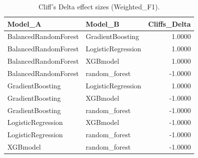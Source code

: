 \begin{table}[t]
\centering
\begin{tabular}{llr}
\toprule
Model_A & Model_B & Cliffs_Delta \\
\midrule
BalancedRandomForest & GradientBoosting & 1.0000 \\
BalancedRandomForest & LogisticRegression & 1.0000 \\
BalancedRandomForest & XGBmodel & 1.0000 \\
BalancedRandomForest & random_forest & -1.0000 \\
GradientBoosting & LogisticRegression & 1.0000 \\
GradientBoosting & XGBmodel & -1.0000 \\
GradientBoosting & random_forest & -1.0000 \\
LogisticRegression & XGBmodel & -1.0000 \\
LogisticRegression & random_forest & -1.0000 \\
XGBmodel & random_forest & -1.0000 \\
\bottomrule
\end{tabular}
\caption{Cliff's Delta effect sizes (Weighted_F1).}
\label{tab:cliffs_Weighted_F1}
\end{table}